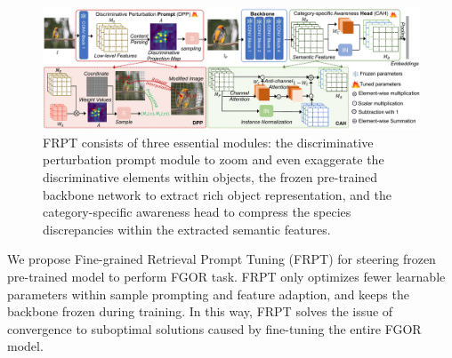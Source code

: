 \documentclass[letterpaper]{article} %
\begin{document}
\begin{figure}[t]
\begin{center}
   \includegraphics[width=1\linewidth]{ap}
\end{center}
   \caption{FRPT consists of three essential modules: the discriminative perturbation prompt module to zoom and even exaggerate the discriminative elements within objects, the frozen pre-trained backbone network to extract rich object representation, and the category-specific awareness head to compress the species discrepancies within the extracted semantic features.}

\end{figure}




We propose Fine-grained Retrieval Prompt Tuning (FRPT) for steering frozen pre-trained model to perform FGOR task. FRPT only optimizes fewer learnable parameters within sample prompting and feature adaption, and keeps the backbone frozen during training. In this way, FRPT solves the issue of convergence to suboptimal solutions caused by fine-tuning the entire FGOR model.
\end{document}
